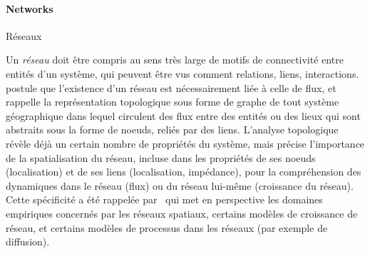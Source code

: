 



\paragraph{Networks}{Réseaux}




Un \emph{réseau} doit être compris au sens très large de motifs de connectivité entre entités d'un système, qui peuvent être vus comment relations, liens, interactions. \cite{haggett1970network} postule que l'existence d'un réseau est nécessairement liée à celle de flux, et rappelle la représentation topologique sous forme de graphe de tout système géographique dans lequel circulent des flux entre des entités ou des lieux qui sont abstraits sous la forme de noeuds, reliés par des liens. L'analyse topologique révèle déjà un certain nombre de propriétés du système, mais \cite{haggett1970network} précise l'importance de la spatialisation du réseau, incluse dans les propriétés de ses noeuds (localisation) et de ses liens (localisation, impédance), pour la compréhension des dynamiques dans le réseau (flux) ou du réseau lui-même (croissance du réseau). Cette spécificité a été rappelée par~\cite{barthelemy2011spatial} qui met en perspective les domaines empiriques concernés par les réseaux spatiaux, certains modèles de croissance de réseau, et certains modèles de processus dans les réseaux (par exemple de diffusion).




